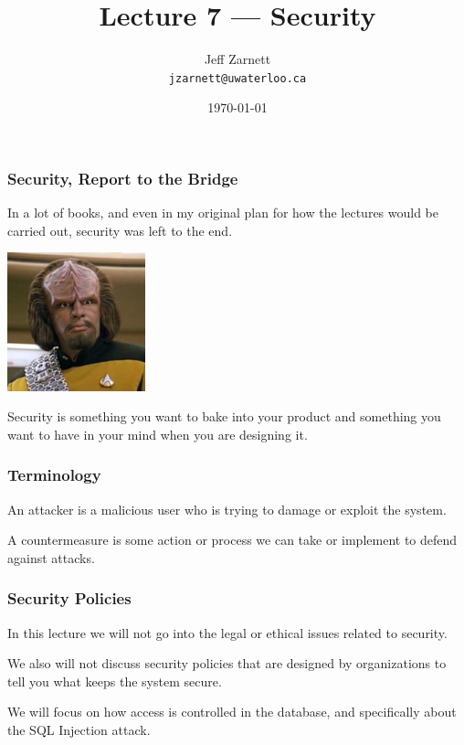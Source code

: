 

\title{Lecture 7 --- Security }

\author{Jeff Zarnett \\ \small \texttt{jzarnett@uwaterloo.ca}}
\date{\today}




\begin{frame}
  \titlepage

 \end{frame}



\begin{frame}
\frametitle{Security, Report to the Bridge}


In a lot of books, and even in my original plan for how the lectures would be carried out, security was left to the end. 

\begin{center}
	\includegraphics[width=0.3\textwidth]{images/worf.jpg}
\end{center}

Security is something you want to bake into your product and something you want to have in your mind when you are designing it. 

 \end{frame}


\begin{frame}
\frametitle{Terminology}

An \alert{attacker} is a malicious user who is trying to damage or exploit the system. 

A \alert{countermeasure} is some action or process we can take or implement to defend against attacks. 

\end{frame}


\begin{frame}
\frametitle{Security Policies}

In this lecture we will not go into the legal or ethical issues related to security.

We also will not discuss security policies that are designed by organizations to tell you what keeps the system secure. 

We will focus on how access is controlled in the database, and specifically about the SQL Injection attack. 


\end{frame}


